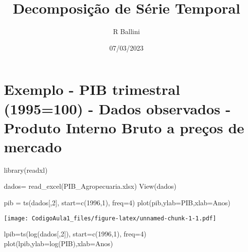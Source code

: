 \documentclass[
]{article}
\title{Decomposição de Série Temporal}
\author{R Ballini}
\date{07/03/2023}
\newenvironment{Shaded}{\begin{snugshade}}{\end{snugshade}}
\newcommand{\AttributeTok}[1]{\textcolor[rgb]{0.77,0.63,0.00}{#1}}
\newcommand{\DecValTok}[1]{\textcolor[rgb]{0.00,0.00,0.81}{#1}}
\newcommand{\FunctionTok}[1]{\textcolor[rgb]{0.00,0.00,0.00}{#1}}
\newcommand{\NormalTok}[1]{#1}
\newcommand{\OtherTok}[1]{\textcolor[rgb]{0.56,0.35,0.01}{#1}}
\newcommand{\StringTok}[1]{\textcolor[rgb]{0.31,0.60,0.02}{#1}}
\begin{document}
\maketitle

{
\setcounter{tocdepth}{2}
\tableofcontents
}
\hypertarget{exemplo---pib-trimestral-1995100---dados-observados---produto-interno-bruto-a-preuxe7os-de-mercado}{%
\section{Exemplo - PIB trimestral (1995=100) - Dados observados -
Produto Interno Bruto a preços de
mercado}\label{exemplo---pib-trimestral-1995100---dados-observados---produto-interno-bruto-a-preuxe7os-de-mercado}}

\begin{Shaded}
\begin{Highlighting}[]
\FunctionTok{library}\NormalTok{(readxl)}

\NormalTok{dados}\OtherTok{=} \FunctionTok{read\_excel}\NormalTok{(}\StringTok{\textquotesingle{}PIB\_Agropecuaria.xlsx\textquotesingle{}}\NormalTok{)}
\FunctionTok{View}\NormalTok{(dados)}

\NormalTok{pib }\OtherTok{=} \FunctionTok{ts}\NormalTok{(dados[,}\DecValTok{2}\NormalTok{], }\AttributeTok{start=}\FunctionTok{c}\NormalTok{(}\DecValTok{1996}\NormalTok{,}\DecValTok{1}\NormalTok{), }\AttributeTok{freq=}\DecValTok{4}\NormalTok{)}
\FunctionTok{plot}\NormalTok{(pib,}\AttributeTok{ylab=}\StringTok{\textquotesingle{}PIB\textquotesingle{}}\NormalTok{,}\AttributeTok{xlab=}\StringTok{\textquotesingle{}Anos\textquotesingle{}}\NormalTok{)}
\end{Highlighting}
\end{Shaded}

\texttt{[image: CodigoAula1\_files/figure-latex/unnamed-chunk-1-1.pdf]}

\begin{Shaded}
\begin{Highlighting}[]
\NormalTok{lpib}\OtherTok{=}\FunctionTok{ts}\NormalTok{(}\FunctionTok{log}\NormalTok{(dados[,}\DecValTok{2}\NormalTok{]), }\AttributeTok{start=}\FunctionTok{c}\NormalTok{(}\DecValTok{1996}\NormalTok{,}\DecValTok{1}\NormalTok{), }\AttributeTok{freq=}\DecValTok{4}\NormalTok{)}
\FunctionTok{plot}\NormalTok{(lpib,}\AttributeTok{ylab=}\StringTok{\textquotesingle{}log(PIB)\textquotesingle{}}\NormalTok{,}\AttributeTok{xlab=}\StringTok{\textquotesingle{}Anos\textquotesingle{}}\NormalTok{)}
\end{Highlighting}
\end{Shaded}
\end{document}
